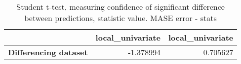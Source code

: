 \begin{table}[h]
\centering
\caption{Student t-test, measuring confidence of significant difference between predictions, statistic value. MASE error - stats}
\label{table:ttest-stats-differencing-experiments-MASE}
\begin{tabular}{lrr}
\toprule
{} &  local\_univariate &  local\_univariate \\
\midrule
\textbf{Differencing dataset} &         -1.378994 &          0.705627 \\
\bottomrule
\end{tabular}
\end{table}
